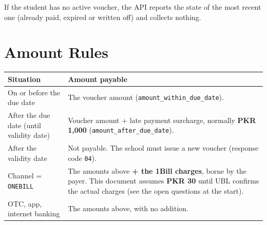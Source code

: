\documentclass[11pt]{article}
\begin{document}
\medskip
\noindent If the student has no active voucher, the API reports the state of the most recent one (already paid, expired
or written off) and collects nothing.

\medskip
\noindent{}

\section{Amount Rules}\label{sec:amounts}

\begin{center}
\begin{tabularx}{\textwidth}{@{}l L@{}}
\toprule
\textbf{Situation} & \textbf{Amount payable} \\
\midrule
On or before the due date & The voucher amount (\texttt{amount\_within\_due\_date}). \\
After the due date (until validity date) & Voucher amount + late payment surcharge, normally \textbf{PKR 1,000} (\texttt{amount\_after\_due\_date}). \\
After the validity date & Not payable. The school must issue a new voucher (response code \texttt{04}). \\
Channel = \texttt{ONEBILL} & The amounts above \textbf{+ the 1Bill charges}, borne by the payer. This document assumes \textbf{PKR 30} until UBL confirms the actual charges (see the open questions at the start). \\
OTC, app, internet banking & The amounts above, with no addition. \\
\bottomrule
\end{tabularx}
\end{center}
\end{document}
